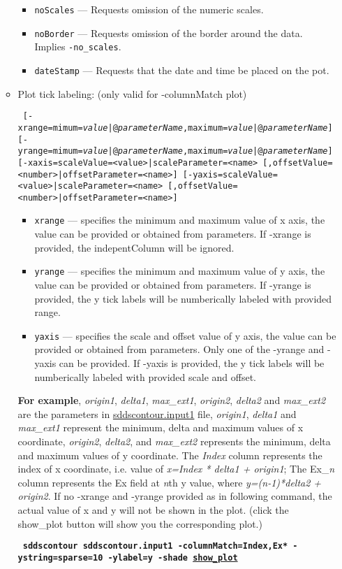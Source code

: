\begin{itemize}
\begin{itemize}
\begin{itemize}
        \item \verb|noScales| --- Requests omission of the numeric scales.
        \item \verb|noBorder| --- Requests omission of the border around the data.  Implies \verb|-no_scales|.
        \item \verb|dateStamp| --- Requests that the date and time be placed on the pot.
        \end{itemize}
    \item Plot tick labeling: (only valid for -columnMatch plot)
\begin{flushleft}{\tt
[-xrange=mimum={\em value}|@{\em parameterName},maximum={\em value}|@{\em parameterName}] 
[-yrange=mimum={\em value}|@{\em parameterName},maximum={\em value}|@{\em parameterName}]
[-xaxis=scaleValue=<value>|scaleParameter=<name>
   [,offsetValue=<number>|offsetParameter=<name>] 
[-yaxis=scaleValue=<value>|scaleParameter=<name>
   [,offsetValue=<number>|offsetParameter=<name>]
}\end{flushleft}
        \begin{itemize} 
        \item \verb|xrange| --- specifies the minimum and maximum value of x axis, the value can be provided or obtained from parameters. If -xrange is provided, the indepentColumn will be ignored.
        \item \verb|yrange| --- specifies the minimum and maximum value of y axis, the value can be provided or obtained from parameters. If -yrange is provided, the y tick labels will be numberically labeled with provided range.
        \item \verb|yaxis| --- specifies the scale and offset value of y axis, the value can be provided or obtained from parameters. Only one of the -yrange and -yaxis can be provided. If -yaxis is provided, the y tick labels will be numberically labeled with provided scale and offset.
        \end{itemize}
        {\bf For example}, {\em origin1}, {\em delta1}, {\em max\_ext1}, {\em origin2}, {\em delta2} and {\em max\_ext2} are the parameters in \href{https://ops.aps.anl.gov/manuals/example_files/sddscontour.input1}{sddscontour.input1} file, {\em origin1}, {\em delta1} and {\em max\_ext1} represent the minimum, delta and maximum values of x coordinate, {\em origin2}, {\em delta2}, and {\em max\_ext2} represents the minimum, delta and maximum values of y coordinate. The {\em Index} column represents the index of x coordinate, i.e. value of {\em x=Index * delta1 + origin1}; The Ex\_{\em n} column represents the Ex field at {\em n}th y value, where {\em y=(n-1)*delta2 + origin2}. If no -xrange and -yrange provided as in following command, the actual value of x and y will not be shown in the plot. (click the show\_plot button will show you the corresponding plot.) 
       \begin{flushleft}{\tt \bf
            sddscontour sddscontour.input1 -columnMatch=Index,Ex* -ystring=sparse=10 -ylabel=y -shade
         \href{https://ops.aps.anl.gov/manuals/example_files/sddscontour1_img.html}{show\_plot}
        }\end{flushleft}


\end{itemize}
\end{itemize}
